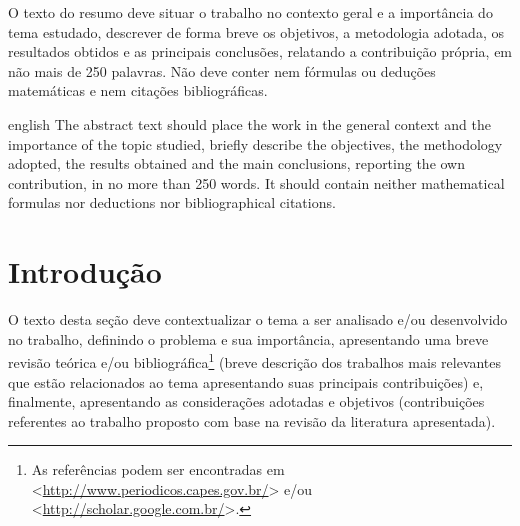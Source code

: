 \documentclass[%
  article,%
  10pt,%
  a4paper,%
  fleqn,%
  oneside,%
  sumario = tradicional,%
  chapter = TITLE,%
  section = TITLE,%
]{abntex2}
\begin{document}
\pretextual%

\begin{paginadetitulo}%

\begin{ambienteresumo}%
O texto do resumo deve situar o trabalho no contexto geral e a importância do tema estudado, descrever de forma breve os objetivos, a metodologia adotada, os resultados obtidos e as principais conclusões, relatando a contribuição própria, em não mais de 250 palavras. Não deve conter nem fórmulas ou deduções matemáticas e nem citações bibliográficas.
\end{ambienteresumo}

\begin{ambienteresumo}[Abstract]%
\begin{otherlanguage*}{english}%
The abstract text should place the work in the general context and the importance of the topic studied, briefly describe the objectives, the methodology adopted, the results obtained and the main conclusions, reporting the own contribution, in no more than 250 words. It should contain neither mathematical formulas nor deductions nor bibliographical citations.
\end{otherlanguage*}
\end{ambienteresumo}

\end{paginadetitulo}

\textual%

\section{Introdução}\label{sec:intro}

O texto desta seção deve contextualizar o tema a ser analisado e/ou desenvolvido no trabalho, definindo o problema e sua importância, apresentando uma breve revisão teórica e/ou bibliográfica\footnote{As referências podem ser encontradas em <\url{http://www.periodicos.capes.gov.br/}> e/ou <\url{http://scholar.google.com.br/}>.} (breve descrição dos trabalhos mais relevantes que estão relacionados ao tema apresentando suas principais contribuições) e, finalmente, apresentando as considerações adotadas e objetivos (contribuições referentes ao trabalho proposto com base na revisão da literatura apresentada).
\end{document}

